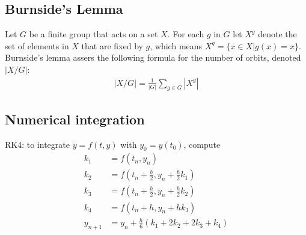 \documentclass[portrait, 8pt, a4paper, oneside, twocolumn]{extarticle}
\begin{document}
\subsection{Burnside's Lemma}
Let $G$ be a finite group that acts on a set $X$. For each $g$ in $G$ let $X^g$ denote the set of elements in $X$ that are fixed by $g$, which means $X^g=\{x\in X| g(x)=x\}$. Burnside's lemma assers the following formula for the number of orbits, denoted $|X/G|$:
\begin{align*}
	|X/G|=\frac{1}{|G|} \sum_{g\in G} |X^g|
\end{align*}

\subsection{Numerical integration}
RK4: to integrate $\dot{y} = f(t, y)$ with $y_0 = y(t_0)$, compute
\begin{align*}
	k_1 &= f(t_n, y_n) \\
	k_2 &= f(t_n + \frac h 2, y_n + \frac h 2 k_1) \\
	k_3 &= f(t_n + \frac h 2, y_n + \frac h 2 k_2) \\
	k_4 &= f(t_n + h, y_n + h k_3) \\
	y_{n+1} &= y_n + \frac h 6 (k_1 + 2k_2 + 2k_3 + k_4) 
\end{align*}
\end{document}
